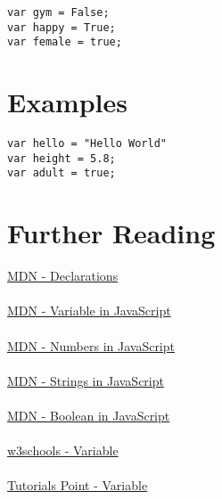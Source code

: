 \documentclass[12pt, letterpaper]{article}
\begin{document}
\begin{lstlisting}
var gym = False;
var happy = True;
var female = true;
\end{lstlisting}


\section*{Examples}

\begin{lstlisting}
var hello = "Hello World"
var height = 5.8;
var adult = true;
\end{lstlisting}

\section*{Further Reading}

\href{https://developer.mozilla.org/en-US/docs/Web/JavaScript/Guide/Grammar_and_types#Declarations}{MDN - Declarations}\\
\\
\href{https://developer.mozilla.org/en-US/docs/Web/JavaScript/Reference/Statements/var}{MDN - Variable in JavaScript}\\
\\
\href{https://developer.mozilla.org/en-US/docs/Web/JavaScript/Data_structures#Number_type}{MDN - Numbers in JavaScript}\\
\\
\href{https://developer.mozilla.org/en-US/docs/Web/JavaScript/Reference/Global_Objects/String}{MDN - Strings in JavaScript}\\
\\
\href{https://developer.mozilla.org/en-US/docs/Glossary/Boolean}{MDN - Boolean in JavaScript}\\
\\
\href{http://www.w3schools.com/js/js_variables.asp}{w3schools - Variable}\\
\\
\href{https://www.tutorialspoint.com/javascript/javascript_variables.htm}{Tutorials Point - Variable}
\end{document}
